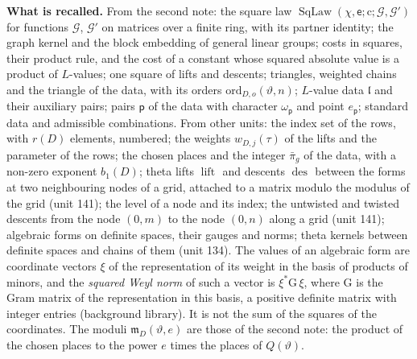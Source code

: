 \documentclass[11pt,a4paper]{article}
\newcommand{\kw}[1]{\emph{#1}}
\newcommand{\subhead}[1]{\par\addvspace{9pt plus 2pt}\Needspace{4\baselineskip}\noindent\textbf{#1}\enspace\ignorespaces}
\theoremstyle{plainx}
\theoremstyle{uprightx}
\newcommand{\pp}{\mathsf{p}}
\newcommand{\fm}{\mathfrak{m}}
\newcommand{\fl}{\mathfrak{l}}
\newcommand{\rc}{\mathrm{c}}
\newcommand{\cG}{\mathcal{G}}
\newcommand{\SqLaw}[5]{\operatorname{SqLaw}(#1,#2;#3;#4,#5)}
\newcommand{\dn}[2]{\operatorname{des}^{#1}_{#2}}
\newcommand{\up}[2]{\operatorname{lift}^{#1}_{#2}}
\begin{document}
\subhead{What is recalled.} From the second note: the square law $\SqLaw{\chi}{\mathsf{e}}{\rc}{\cG}{\cG'}$ for
functions $\cG$, $\cG'$ on matrices over a finite ring, with its partner identity; the graph kernel and the
block embedding of general linear groups; costs in squares, their product rule, and the cost of a constant whose
squared absolute value is a product of $L$-values; one square of lifts and descents; triangles, weighted chains
and the triangle of the data, with its orders $\mathrm{ord}_{D,o}(\vartheta,n)$; $L$-value data $\fl$ and their
auxiliary pairs; pairs $\pp$ of the data with character $\omega_{\pp}$ and point $e_{\pp}$; standard data and
admissible combinations. From other units: the index set of the rows, with $r(D)$ elements, numbered; the weights
$w_{D,j}(\tau)$ of the lifts and the parameter of the rows; the chosen places and the integer $\bar\pi_g$ of the
data, with a non-zero exponent $b_1(D)$; theta lifts $\up{}{}$ and descents $\dn{}{}$ between the forms at
two neighbouring nodes of a grid, attached to a matrix modulo the modulus of the grid (unit 141); the level of a
node and its index; the untwisted and twisted descents from the node $(0,m)$ to the node $(0,n)$ along a grid
(unit 141); algebraic forms on definite spaces, their gauges and norms; theta kernels between definite spaces
and chains of them (unit 134). The values of an algebraic form are coordinate vectors $\xi$ of the representation
of its weight in the basis of products of minors, and the \kw{squared Weyl norm} of such a vector is
$\xi^{*}\mathrm{G}\,\xi$, where $\mathrm{G}$ is the Gram matrix of the representation in this basis, a positive
definite matrix with integer entries (background library). It is not the sum of the squares of the coordinates.
The moduli $\fm_D(\vartheta,e)$ are those of the second note: the product of the chosen places to the power $e$
times the places of $Q(\vartheta)$.
\end{document}
